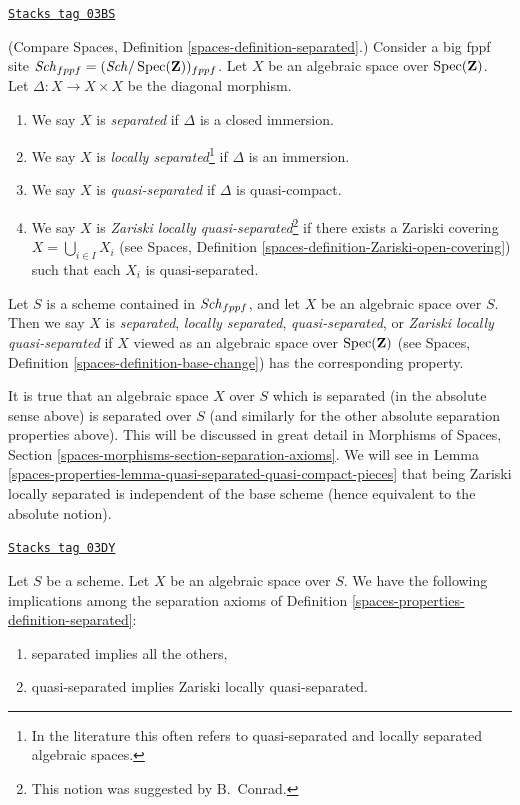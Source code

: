 \begin{definition}[Separated]
\label{spaces-properties-definition-separated}
\href{https://stacks.math.columbia.edu/tag/03BS}{\texttt{Stacks tag 03BS}}

(Compare Spaces, Definition \ref{spaces-definition-separated}.)
Consider a big fppf site
$\mathit{Sch}_{fppf} = (\mathit{Sch}/\operatorname{Spec}(\mathbf{Z}))_{fppf}$.
Let $X$ be an algebraic space over
$\operatorname{Spec}(\mathbf{Z})$. Let $\Delta : X \to X \times X$
be the diagonal morphism.
\begin{enumerate}
\item We say $X$ is {\it separated} if $\Delta$ is a closed immersion.
\item We say $X$ is {\it locally separated}\footnote{In the
literature this often refers to quasi-separated and locally
separated algebraic spaces.} if $\Delta$ is an
immersion.
\item We say $X$ is {\it quasi-separated} if $\Delta$ is quasi-compact.
\item We say $X$ is {\it Zariski locally quasi-separated}\footnote{
This notion was suggested by B.\ Conrad.} if there
exists a Zariski covering $X = \bigcup_{i \in I} X_i$ (see Spaces,
Definition \ref{spaces-definition-Zariski-open-covering}) such that
each $X_i$ is quasi-separated.
\end{enumerate}
Let $S$ is a scheme contained in $\mathit{Sch}_{fppf}$, and let
$X$ be an algebraic space over $S$. Then we say $X$ is {\it separated},
{\it locally separated}, {\it quasi-separated}, or
{\it Zariski locally quasi-separated}
if $X$ viewed as an algebraic space over $\operatorname{Spec}(\mathbf{Z})$ (see
Spaces, Definition \ref{spaces-definition-base-change})
has the corresponding property.
\end{definition}

It is true that an algebraic space $X$ over $S$ which is separated
(in the absolute sense above) is separated over $S$ (and similarly
for the other absolute separation properties above). This will be discussed
in great detail in
Morphisms of Spaces, Section \ref{spaces-morphisms-section-separation-axioms}.
We will see in
Lemma \ref{spaces-properties-lemma-quasi-separated-quasi-compact-pieces}
that being Zariski locally separated is independent of the base scheme
(hence equivalent to the absolute notion).

\begin{lemma}
\label{spaces-properties-lemma-trivial-implications}
\href{https://stacks.math.columbia.edu/tag/03DY}{\texttt{Stacks tag 03DY}}

Let $S$ be a scheme.
Let $X$ be an algebraic space over $S$.
We have the following implications among the separation axioms
of Definition \ref{spaces-properties-definition-separated}:
\begin{enumerate}
\item separated implies all the others,
\item quasi-separated implies Zariski locally quasi-separated.
\end{enumerate}
\end{lemma}

